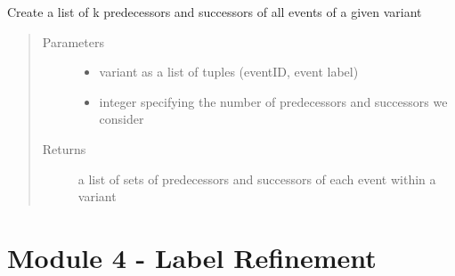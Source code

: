 \documentclass[letterpaper,10pt,english]{sphinxmanual}
\begin{document}
\begin{fulllineitems}
\label{\detokenize{cost function:costFunction.cost.context2}}
Create a list of k predecessors and successors of all events of a given variant
\begin{quote}\begin{description}
\item[{Parameters}] \leavevmode\begin{itemize}
\item {} 
 \textendash{} variant as a list of tuples (eventID, event label)

\item {} 
 \textendash{} integer specifying the number of predecessors and successors we consider

\end{itemize}

\item[{Returns}] \leavevmode
a list of sets of predecessors and successors of each event within a variant

\end{description}\end{quote}

\end{fulllineitems}


\begin{DUlineblock}{0em}
\item[] 
\end{DUlineblock}

{\hyperref[\detokenize{index:mastertoc}]{}}


\chapter{Module 4 - Label Refinement}
\label{\detokenize{refinement:module-4-label-refinement}}\label{\detokenize{refinement::doc}}
\begin{DUlineblock}{0em}
\item[] 
\end{DUlineblock}
\end{document}
